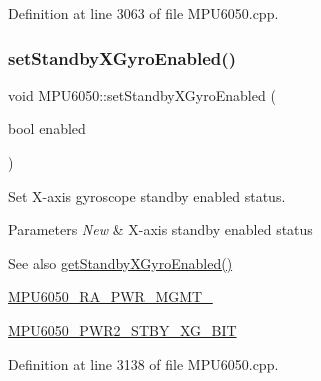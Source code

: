 Definition at line 3063 of file M\+P\+U6050.\+cpp.


\begin{DoxyCode}{0}

\end{DoxyCode}
\mbox{\label{classMPU6050_ac1c6d8f623a9ca00a4ddc50f6615b977}} 
\subsubsection{\texorpdfstring{setStandbyXGyroEnabled()}{setStandbyXGyroEnabled()}}
{\footnotesize\ttfamily void M\+P\+U6050\+::set\+Standby\+X\+Gyro\+Enabled (\begin{DoxyParamCaption}\item[{bool}]{enabled }\end{DoxyParamCaption})}

Set X-\/axis gyroscope standby enabled status. 
\begin{DoxyParams}{Parameters}
{\em New} & X-\/axis standby enabled status \\
\hline
\end{DoxyParams}
\begin{DoxySeeAlso}{See also}
\mbox{\hyperlink{classMPU6050_acb5fde4167aa54fbbe84706d577a48a6}{get\+Standby\+X\+Gyro\+Enabled()}} 

\mbox{\hyperlink{MPU6050_8h_aace6ce286da4d5f8c8f5ba6f80688e13}{M\+P\+U6050\+\_\+\+R\+A\+\_\+\+P\+W\+R\+\_\+\+M\+G\+M\+T\+\_}} 

\mbox{\hyperlink{MPU6050_8h_aab0f2205a6568a80659bfafbe770cae8}{M\+P\+U6050\+\_\+\+P\+W\+R2\+\_\+\+S\+T\+B\+Y\+\_\+\+X\+G\+\_\+\+B\+IT}} 
\end{DoxySeeAlso}


Definition at line 3138 of file M\+P\+U6050.\+cpp.


